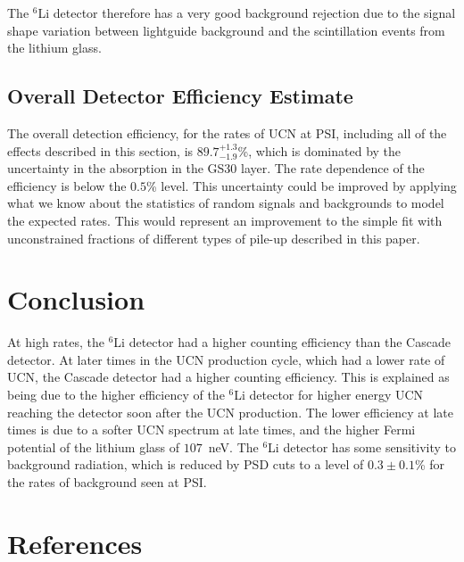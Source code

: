 \documentclass[review]{elsarticle}
\begin{document}
The $^6$Li detector therefore has a very good background rejection due
to the signal shape variation between lightguide background and the
scintillation events from the lithium glass.

\subsection{Overall Detector Efficiency Estimate}

The overall detection efficiency, for the rates of UCN at PSI,
including all of the effects described in this section, is
$89.7^{+1.3}_{-1.9}$\%, which is dominated by the uncertainty in the
absorption in the GS30 layer. The rate dependence of the efficiency is
below the $0.5$\% level.  This uncertainty could be improved by
applying what we know about the statistics of random signals and
backgrounds to model the expected rates.  This would represent an
improvement to the simple fit with unconstrained fractions of
different types of pile-up described in this paper.

\section{Conclusion}

At high rates, the $^6$Li detector had a higher counting efficiency
than the Cascade detector.  At later times in the UCN production
cycle, which had a lower rate of UCN, the Cascade detector had a
higher counting efficiency.  This is explained as being due to the
higher efficiency of the $^{6}$Li detector for higher energy UCN
reaching the detector soon after the UCN production.  The lower
efficiency at late times is due to a softer UCN spectrum at late
times, and the higher Fermi potential of the lithium glass of
$107$~neV.  The $^6$Li detector has some sensitivity to background
radiation, which is reduced by PSD cuts to a level of $0.3\pm0.1$\%
for the rates of background seen at PSI.


\section*{References}


%
%
\end{document}
